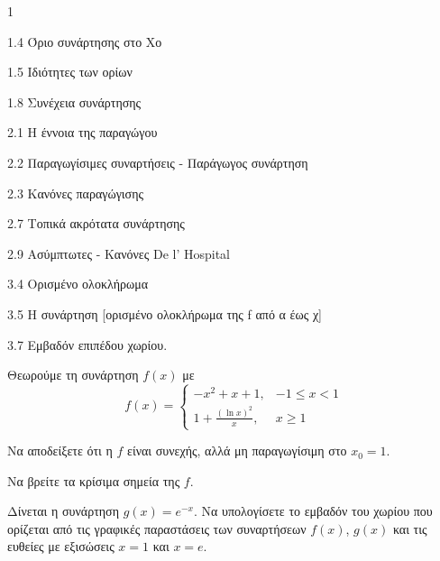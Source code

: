 \begin{ylh}{1}
    \item 1.4 Όριο συνάρτησης στο Χο
    \item 1.5 Ιδιότητες των ορίων
    \item 1.8 Συνέχεια συνάρτησης
    \item 2.1 Η έννοια της παραγώγου
    \item 2.2 Παραγωγίσιμες συναρτήσεις - Παράγωγος συνάρτηση
    \item 2.3 Κανόνες παραγώγισης
    \item 2.7 Τοπικά ακρότατα συνάρτησης
    \item 2.9 Ασύμπτωτες - Κανόνες De l’ Hospital
    \item 3.4 Ορισμένο ολοκλήρωμα
    \item 3.5 Η συνάρτηση [ορισμένο ολοκλήρωμα της f από α έως χ]
    \item 3.7 Εμβαδόν επιπέδου χωρίου.
\end{ylh}
Θεωρούμε τη συνάρτηση $f(x)$ με
\[
f(x) = \begin{cases}
    -x^2 + x + 1, & -1 \leq x < 1 \\
    1 + \frac{(\ln x)^2}{x}, & x \geq 1
\end{cases}
\]

\begin{alist}
\item Να αποδείξετε ότι η $f$ είναι συνεχής, αλλά μη παραγωγίσιμη στο $x_0 = 1$. 
\item Να βρείτε τα κρίσιμα σημεία της $f$. 
\item Δίνεται η συνάρτηση $g(x) = e^{-x}$. Να υπολογίσετε το εμβαδόν του χωρίου που ορίζεται από τις γραφικές παραστάσεις των συναρτήσεων $f(x)$, $g(x)$ και τις ευθείες με εξισώσεις $x = 1$ και $x = e$. 
\end{alist}